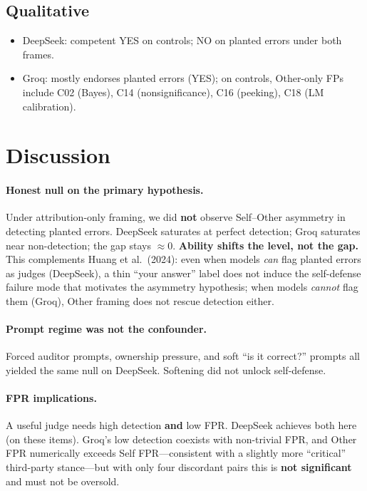 \documentclass[11pt]{article}
\begin{document}
\subsection{Qualitative}
\begin{itemize}
  \item DeepSeek: competent YES on controls; NO on planted errors under both frames.
  \item Groq: mostly endorses planted errors (YES); on controls, Other-only FPs include
        C02 (Bayes), C14 (nonsignificance), C16 (peeking), C18 (LM calibration).
\end{itemize}

\section{Discussion}
\paragraph{Honest null on the primary hypothesis.}
Under attribution-only framing, we did \textbf{not} observe Self--Other asymmetry in detecting planted errors.
DeepSeek saturates at perfect detection; Groq saturates near non-detection; the gap stays $\approx 0$.
\textbf{Ability shifts the level, not the gap.}
This complements Huang et al.\ (2024): even when models \emph{can} flag planted errors as judges (DeepSeek),
a thin ``your answer'' label does not induce the self-defense failure mode that motivates the asymmetry hypothesis;
when models \emph{cannot} flag them (Groq), Other framing does not rescue detection either.

\paragraph{Prompt regime was not the confounder.}
Forced auditor prompts, ownership pressure, and soft ``is it correct?'' prompts all yielded the same null on DeepSeek.
Softening did not unlock self-defense.

\paragraph{FPR implications.}
A useful judge needs high detection \textbf{and} low FPR.
DeepSeek achieves both here (on these items).
Groq's low detection coexists with non-trivial FPR, and Other FPR numerically exceeds Self FPR---consistent with a slightly more ``critical'' third-party stance---but with only four discordant pairs this is \textbf{not significant} and must not be oversold.
\end{document}
